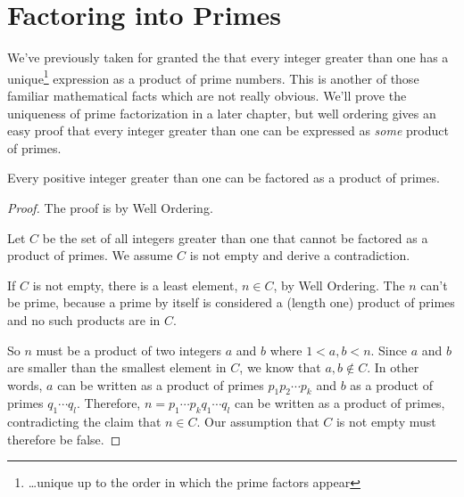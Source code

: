 \begin{problems}
\practiceproblems
{}

\classproblems
{}

\homeworkproblems
{}

\examproblems
{}
\end{problems}

\section{Factoring into Primes}

We've previously taken for granted the  that every integer greater than one has a
unique\footnote{\dots unique up to the order in which the prime
  factors appear} expression as a product of prime numbers.  This is
another of those familiar mathematical facts which are not really
obvious.  We'll prove the uniqueness of prime factorization in a later
chapter, but well ordering gives an easy proof that every integer
greater than one can be expressed as \emph{some} product of primes.

\begin{theorem}\label{factor_into_primes}
Every positive integer greater than one can be factored as a product of primes.
\end{theorem}
\begin{proof}
The proof is by Well Ordering.

Let $C$ be the set of all integers greater than one that cannot be
factored as a product of primes.  We assume $C$ is not empty and derive a
contradiction.

If $C$ is not empty, there is a least element, $n \in C$, by Well
Ordering.  The $n$ can't be prime, because a prime by itself is considered
a (length one) product of primes and no such products are in $C$.

So $n$ must be a product of two integers $a$ and $b$ where $1<a,b<n$.
Since $a$ and $b$ are smaller than the smallest element in $C$, we know
that $a,b \notin C$.  In other words, $a$ can be written as a product of
primes $p_1p_2\cdots p_k$ and $b$ as a product of primes $q_1\cdots q_l$.
Therefore, $n=p_1\cdots p_k q_1 \cdots q_l$ can be written as a product of
primes, contradicting the claim that $n \in C$.  Our assumption that $C$
is not empty must therefore be false.
\end{proof}



\endinput
